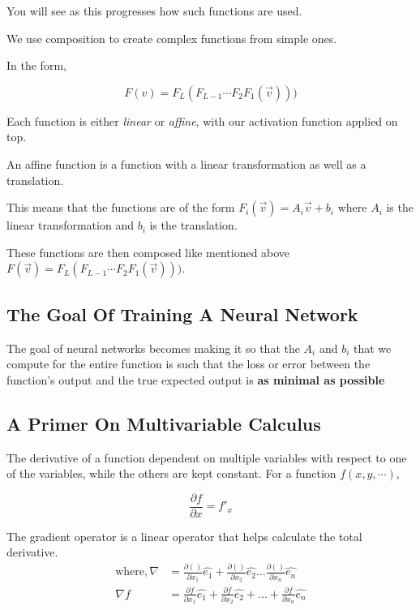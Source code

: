 \documentclass[11pt]{article}
\begin{document}
You will see as this progresses how such functions are used.

We use composition to create complex functions from simple ones.

In the form,

$$F(v) = F_L(F_{L-1} \cdots F_2F_1(\vec{v})))$$

Each function is either \emph{linear} or \emph{affine}, with our activation function applied on top.

\begin{definition}
An affine function is a function with a linear transformation as well as a translation.
\end{definition}

This means that the functions are of the form \(F_i(\vec{v}) = A_{i}\vec{v} + b_i\) where \(A_i\) is the linear transformation and \(b_i\) is the translation.

These functions are then composed like mentioned above  \(F(\vec{v}) = F_L(F_{L-1}\cdots F_2F_1(\vec{v})))\).
\subsection{The Goal Of Training A Neural Network}
\label{sec:orgc412071}
The goal of neural networks becomes making it so that the \(A_i\) and \(b_i\) that we compute for the entire function is such that the loss or error between the function's output and the true expected output is \textbf{as minimal as possible}
\subsection{A Primer On Multivariable Calculus}
\label{sec:org2595979}

\begin{definition}
The derivative of a function dependent on multiple variables with respect to one of the variables, while the others are kept constant. For a function $f(x,y,\cdots)$,

\[\frac{\partial f}{\partial x} = f'_x\]
\end{definition}

\begin{definition}
   The gradient operator is a linear operator that helps calculate the total derivative.
\begin{align*}
   \text{where}, \nabla &= \frac{\partial ()}{\partial x_1} \hat{e_1} + \frac{\partial ()}{\partial x_2} \hat{e_2} \dots \frac{\partial ()}{\partial x_n} \hat{e_n} \\
   \nabla f &= \frac{\partial f}{\partial x_1}\hat{e_1} + \frac{\partial f}{\partial x_2} \hat{e_2} + \dots + \frac{\partial f}{\partial x_n} \hat{e_n} \\
\end{align*}
\end{definition}
\end{document}
